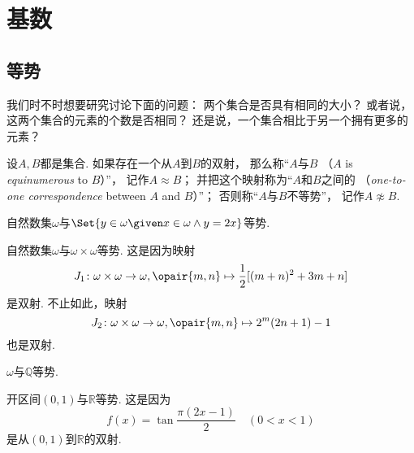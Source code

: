 \section{基数}
\subsection{等势}
我们时不时想要研究讨论下面的问题：
两个集合是否具有相同的大小？
或者说，这两个集合的元素的个数是否相同？
还是说，一个集合相比于另一个拥有更多的元素？

\begin{definition}\label{definition:基数.等势的定义}
设\(A,B\)都是集合.
如果存在一个从\(A\)到\(B\)的双射，
那么称“\(A\)与\(B\) （\(A\) is \emph{equinumerous} to \(B\)）”，
记作\(A \approx B\)；
并把这个映射称为“\(A\)和\(B\)之间的%
（\emph{one-to-one correspondence} between \(A\) and \(B\)）”；
否则称“\(A\)与\(B\)不等势”，
记作\(A \napprox B\).
\end{definition}

\begin{example}
自然数集\(\omega\)与\(\Set{ y \in \omega \given x \in \omega \land y = 2x }\)等势.
\end{example}

\begin{example}
自然数集\(\omega\)与\(\omega\times\omega\)等势.
这是因为映射\[
	J_1\colon \omega\times\omega\to\omega,
	\opair{m,n} \mapsto \frac12[(m+n)^2+3m+n]
\]是双射.
不止如此，映射\[
	J_2\colon \omega\times\omega\to\omega,
	\opair{m,n} \mapsto 2^m(2n+1)-1
\]也是双射.
\end{example}

\begin{example}
\(\omega\)与\(\mathbb{Q}\)等势.
\end{example}

\begin{example}\label{example:基数.开区间与全体实数等势1}
开区间\((0,1)\)与\(\mathbb{R}\)等势.
这是因为\[
	f(x) = \tan\frac{\pi(2x-1)}2
	\quad(0<x<1)
\]是从\((0,1)\)到\(\mathbb{R}\)的双射.
\end{example}

